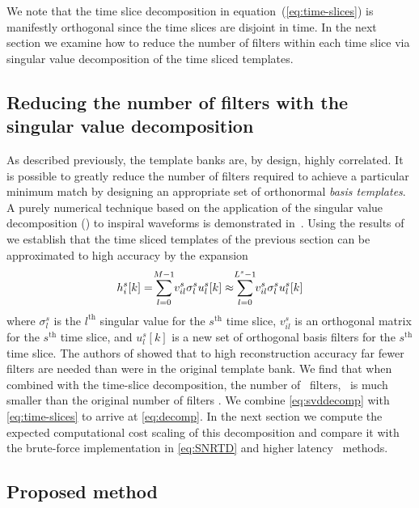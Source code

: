 We note that
the time slice decomposition in equation~(\ref{eq:time-slices}) is manifestly
orthogonal since the time slices are disjoint in time.  In the next
section we examine how to reduce the number of filters within each time slice via
singular value decomposition of the time sliced templates.

\subsection{Reducing the number of filters with the singular value
decomposition}

As described previously, the template banks are, by design, highly correlated.
It is possible to greatly reduce the number of filters required to achieve a
particular minimum match by designing an appropriate set of orthonormal {\em
basis templates}.  A purely numerical technique based on the application of the
singular value decomposition (\SVD) to inspiral waveforms is demonstrated
in~\cite{Cannon:2010p10398}.  Using the results of ~\cite{Cannon:2010p10398} we
establish that the time sliced templates of the previous section can be
approximated to high accuracy by the expansion
%
\begin{equation}
h_i^s[k] = \sum_{\mathclap{l=0}}^{\mathclap{M-1}} v_{il}^s \sigma_l^s u_l^s[k] \approx \sum_{\mathclap{l=0}}^{\mathclap{L^s-1}} v_{il}^s \sigma_l^s u_l^s[k]
\label{eq:svddecomp}
\end{equation}
%
where $\sigma_l^s$ is the $l^{\mathrm{th}}$ singular value for the
$s^{\mathrm{th}}$ time slice, $v_{il}^s$ is an orthogonal matrix for the
$s^{\mathrm{th}}$ time slice, and $u_l^s[k]$ is a new set of orthogonal basis filters
for the $s^{\mathrm{th}}$ time slice.  The authors of \cite{Cannon:2010p10398}
showed that to high reconstruction accuracy far fewer filters are needed than
were in the original template bank. We find that when combined with the
time-slice decomposition, the number of \SVD\ filters, \numsvdtmps\ is much smaller
than the original number of filters \numtmps.  We combine \eqref{eq:svddecomp}
with \eqref{eq:time-slices} to arrive at \eqref{eq:decomp}.  In the next
section we compute the expected computational cost scaling of this
decomposition and compare it with the brute-force implementation in
\eqref{eq:SNRTD} and higher latency \fft\ methods.

\subsection{Proposed method}

